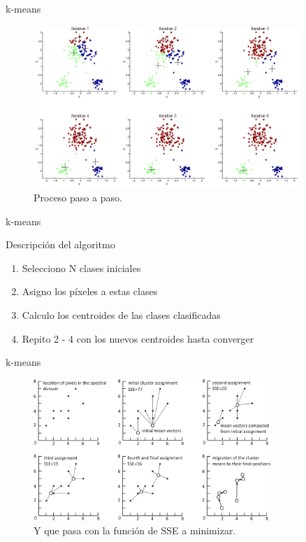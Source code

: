 \documentclass[]{beamer}
\begin{document}
\begin{frame}{k-means}
  \begin{figure}
    \includegraphics[width=0.9\textwidth]{imagenes/step.png}
    \caption{Proceso paso a paso.}
  \end{figure}
\end{frame}

\begin{frame}{k-means}
  \begin{block}{Descripción del algoritmo}
    \begin{enumerate}[<+>]
      \item Selecciono N clases iniciales
      \item Asigno los píxeles a estas clases
      \item Calculo los centroides de las clases clasificadas
      \item Repito 2 - 4 con los nuevos centroides hasta converger
    \end{enumerate}
  \end{block}
\end{frame}

\begin{frame}{k-means}
  \begin{figure}
    \includegraphics[width=0.8\textwidth]{imagenes/sse.png}
    \caption{Y que pasa con la función de SSE a minimizar. }
  \end{figure}
\end{frame}
\end{document}
